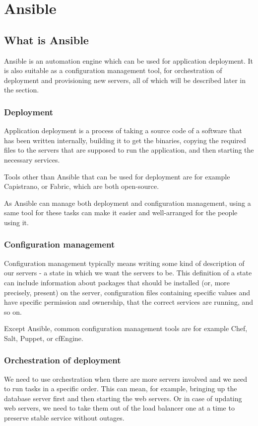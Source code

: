 \section{Ansible}
\label{ch:ansible}

\subsection{What is Ansible}
Ansible is an automation engine which can be used for application deployment. It is also suitable as a configuration management tool, for orchestration of deployment and provisioning new servers, all of which will be described later in the section. \cite{AnsibleOverview}

\subsubsection*{Deployment}
Application deployment is a process of taking a source code of a software that has been written internally, building it to get the binaries, copying the required files to the servers that are supposed to run the application, and then starting the necessary services.

Tools other than Ansible that can be used for deployment are for example Capistrano, or Fabric, which are both open-source. \cite{UpAndRunning}

As Ansible can manage both deployment and configuration management, using a same tool for these tasks can make it easier and well-arranged for the people using it.

\subsubsection*{Configuration management}
Configuration management typically means writing some kind of description of our servers - a state in which we want the servers to be. This definition of a state can include information about packages that should be installed (or, more precisely, present) on the server, configuration files containing specific values and have specific permission and ownership, that the correct services are running, and so on.

Except Ansible, common configuration management tools are for example Chef, Salt, Puppet, or cfEngine.  \cite{UpAndRunning}

\subsubsection*{Orchestration of deployment}
We need to use orchestration when there are more servers involved and we need to run tasks in a specific order. This can mean, for example, bringing up the database server first and then starting the web servers. Or in case of updating web servers, we need to take them out of the load balancer one at a time to preserve stable service without outages.

